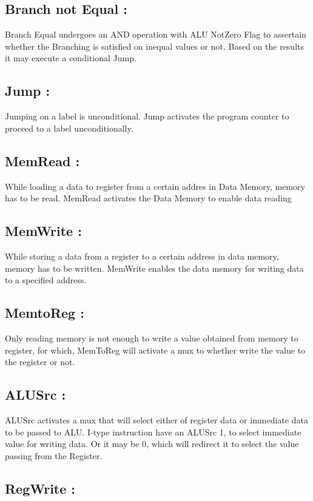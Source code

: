 \documentclass[12pt]{article}
\begin{document}
\subsection{Branch not Equal : }

Branch Equal undergoes an AND operation with ALU NotZero Flag to assertain whether the Branching is satisfied on inequal values or not. Based on the results it may execute a conditional Jump.
\subsection{Jump : }

Jumping on a label is unconditional. Jump activates the program counter to proceed to a label unconditionally.
\subsection{MemRead : }

While loading a data to register from a certain addres in Data Memory, memory has to be read. MemRead activates the Data Memory to enable data reading
\subsection{MemWrite : }

While storing a data from a register to a certain address in data memory, memory has to be written. MemWrite enables the data memory for writing data to a specified address.
\subsection{MemtoReg : }

Only reading memory is not enough to write a value obtained from memory to register, for which, MemToReg will activate a mux to whether write the value to the register or not.
\subsection{ALUSrc : }

ALUSrc activates a mux that will select either of register data or immediate data to be passed to ALU. I-type instruction have an ALUSrc 1, to select immediate value for writing data. Or it may be 0, which will redirect it to select the value passing from the Register. 
\subsection{RegWrite : }
\end{document}
